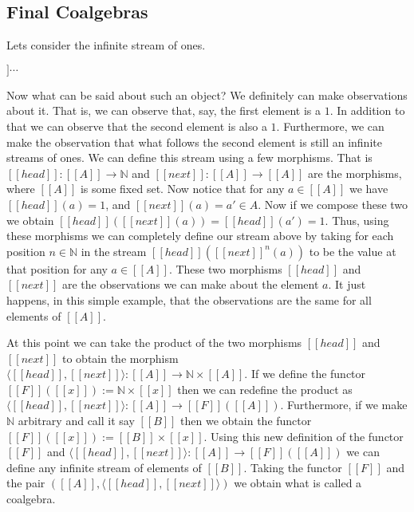 \subsection{Final Coalgebras}
\label{subsec:final_coalgebras}
Lets consider the infinite stream of ones. 
\begin{center}
  \begin{math}
    [[1 :: 1 :: 1 :: 1]] \cdots
  \end{math}
\end{center}
Now what can be said about such an object?  We definitely can make observations about it.
That is, we can observe that, say, the first element is a $1$.  In addition to that we can 
observe that the second element is also a $1$.  Furthermore, we can make the observation 
that what follows the second element is still an infinite streams of ones.
We can define this stream using a few morphisms.  That is $[[head]] : [[A]] \to \mathbb{N}$ and
$[[next]] : [[A]] \to [[A]]$ are the morphisms, where $[[A]]$ is some fixed set.
Now notice that for any $a \in [[A]]$ we have $[[head]](a) = 1$, and 
$[[next]](a) = a' \in A$.  Now if we compose these two we obtain 
$[[head]]([[next]](a)) = [[head]](a') = 1$.  Thus, using these morphisms we can completely
define our stream above by taking for each position $n \in \mathbb{N}$ in the stream 
$[[head]]([[next]]^{n}(a))$ to be the value at that position for any $a \in [[A]]$.  These
two morphisms $[[head]]$ and $[[next]]$ are the observations we can make about the element 
$a$. It just happens, in this simple example, that the observations are the same for all 
elements of $[[A]]$.

At this point we can take the product of the two morphisms $[[head]]$ and $[[next]]$ to
obtain the morphism $\langle [[head]],[[next]] \rangle : [[A]] \to \mathbb{N} \times [[A]]$.
If we define the functor $[[F]]([[x]]) := \mathbb{N} \times [[x]]$ then we can redefine the
product as $\langle [[head]],[[next]] \rangle : [[A]] \to [[F]]([[A]])$.  Furthermore,
if we make $\mathbb{N}$ arbitrary and call it say $[[B]]$ then we obtain 
the functor $[[F]]([[x]]) := [[B]] \times [[x]]$.  Using this new definition of the functor
$[[F]]$ and $\langle [[head]],[[next]] \rangle : [[A]] \to [[F]]([[A]])$ we can define any
infinite stream of elements of $[[B]]$.  Taking the functor $[[F]]$ and the pair
$([[A]], \langle [[head]], [[next]] \rangle)$ we obtain what is called a coalgebra.

